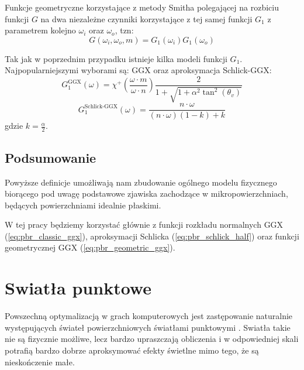 \documentclass[../main.tex]{subfiles}
\begin{document}
Funkcje geometryczne korzystające z metody Smitha polegającej na rozbiciu
funkcji $G$ na dwa niezależne czynniki korzystające z tej samej funkcji $G_1$
z parametrem kolejno $\omega_i$ oraz $\omega_o$, tzn:
\begin{equation}
  G(\omega_i, \omega_o, m) = G_1(\omega_i) G_1(\omega_o)
\end{equation}

Tak jak w poprzednim przypadku istnieje kilka modeli funkcji $G_1$.
Najpopularniejszymi wyborami są: GGX \cite{WalterMicrofacetModels} oraz aproksymacja Schlick-GGX:
\begin{equation}
  G_{1}^{\text{GGX}}(\omega) =
    \chi^{+}\left(\frac{\omega \cdot m}{\omega \cdot n}\right)
    \frac{2}{
      1 + \sqrt{
        1 + \alpha^2 \tan^{2}\left(\theta_v\right)
      }
    }
\label{eq:pbr_geometric_ggx}
\end{equation}
\begin{equation}
  G_{1}^{\text{Schlick-GGX}}(\omega) =
    \frac{n \cdot \omega}{
      (n \cdot \omega)(1 - k) + k
    }
\end{equation}
\noindent gdzie $k = \frac{\alpha}{2}$.

\subsection{Podsumowanie}

Powyższe definicje umożliwają nam zbudowanie ogólnego modelu fizycznego
biorącego pod uwagę podstawowe zjawiska zachodzące w mikropowierzchniach,
będących powierzchniami idealnie płaskimi.

W tej pracy będziemy korzystać głównie z funkcji rozkładu normalnych GGX (\ref{eq:pbr_classic_ggx}), aproksymacji Schlicka (\ref{eq:pbr_schlick_half}) oraz funkcji geometrycznej GGX (\ref{eq:pbr_geometric_ggx}).


\section{Swiatła punktowe}

Powszechną optymalizacją w grach komputerowych jest zastępowanie naturalnie występujących świateł powierzchniowych światłami punktowymi \cite{pbr_background}. Swiatła takie nie są fizycznie możliwe, lecz bardzo upraszczają obliczenia i w odpowiedniej skali potrafią bardzo dobrze aproksymować efekty świetlne mimo tego, że są nieskończenie małe.
\end{document}

